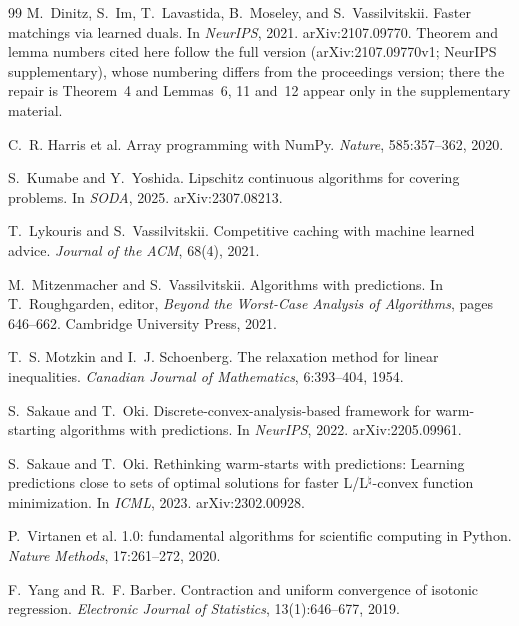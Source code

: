 \begin{thebibliography}{99}
M.~Dinitz, S.~Im, T.~Lavastida, B.~Moseley, and S.~Vassilvitskii.
\newblock Faster matchings via learned duals.
\newblock In \emph{NeurIPS}, 2021. arXiv:2107.09770. Theorem and lemma numbers cited here follow
the full version (arXiv:2107.09770v1; NeurIPS supplementary), whose numbering differs from the
proceedings version; there the repair is Theorem~4 and Lemmas~6, 11 and~12 appear only in the
supplementary material.

C.~R. Harris et al.
\newblock Array programming with {NumPy}.
\newblock \emph{Nature}, 585:357--362, 2020.

S.~Kumabe and Y.~Yoshida.
\newblock Lipschitz continuous algorithms for covering problems.
\newblock In \emph{SODA}, 2025. arXiv:2307.08213.

T.~Lykouris and S.~Vassilvitskii.
\newblock Competitive caching with machine learned advice.
\newblock \emph{Journal of the ACM}, 68(4), 2021.

M.~Mitzenmacher and S.~Vassilvitskii.
\newblock Algorithms with predictions.
\newblock In T.~Roughgarden, editor, \emph{Beyond the Worst-Case Analysis of Algorithms}, pages
646--662. Cambridge University Press, 2021.

T.~S. Motzkin and I.~J. Schoenberg.
\newblock The relaxation method for linear inequalities.
\newblock \emph{Canadian Journal of Mathematics}, 6:393--404, 1954.

S.~Sakaue and T.~Oki.
\newblock Discrete-convex-analysis-based framework for warm-starting algorithms with predictions.
\newblock In \emph{NeurIPS}, 2022. arXiv:2205.09961.

S.~Sakaue and T.~Oki.
\newblock Rethinking warm-starts with predictions: Learning predictions close to sets of optimal
solutions for faster L/L$^\natural$-convex function minimization.
\newblock In \emph{ICML}, 2023. arXiv:2302.00928.

P.~Virtanen et al.
 1.0: fundamental algorithms for scientific computing in {Python}.
\newblock \emph{Nature Methods}, 17:261--272, 2020.

F.~Yang and R.~F. Barber.
\newblock Contraction and uniform convergence of isotonic regression.
\newblock \emph{Electronic Journal of Statistics}, 13(1):646--677, 2019.

\end{thebibliography}
